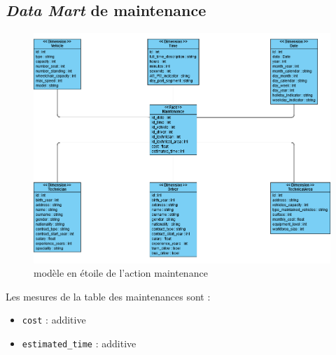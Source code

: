 \documentclass[a4paper,12pt]{report}
\begin{document}
\subsection*{\textit{Data Mart} de \og maintenance \fg}
\label{subsec:data_mart_maintenance}
\begin{figure}[!ht]
  \centering
  \includegraphics[scale=0.65]{images/maintenance_datamart.png}
  \caption{modèle en étoile de l'action \og maintenance \fg}
\end{figure}

Les mesures de la table des maintenances sont :
\begin{itemize}
  \item \texttt{cost} : additive
  \item \texttt{estimated\_time} : additive
\end{itemize}

\newpage
\end{document}

